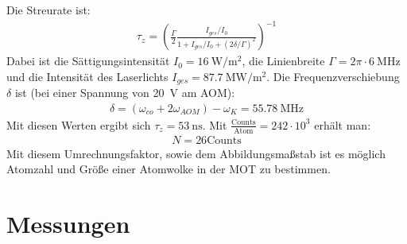 \documentclass[12pt, a4paper]{article}
\begin{document}
    Die Streurate ist:
    \begin{align*}
      \tau_z = \left(
        \frac{\Gamma}{2}
        \frac{I_{ges} / I_0}{1 + I_{ges} / I_0 + (2 \delta / \Gamma)^2}
      \right)^{-1}
    \end{align*}
    Dabei ist die Sättigungsintensität $I_0 = \SI{16}{\W\per\square\m}$, die
    Linienbreite $\Gamma = 2 \pi \cdot \SI{6}{\MHz}$ und die Intensität des Laserlichts
    $I_{ges} = \SI{87.7}{\mega\W\per\square\m}$. Die Frequenzverschiebung $\delta$ ist
    (bei einer Spannung von \SI{20}{\V} am AOM):
    \begin{align*}
      \delta = (\omega_{co} + 2 \omega_{AOM}) - \omega_K = \SI{55.78}{\MHz}
    \end{align*}
    Mit diesen Werten ergibt sich $\tau_z = \SI{53}{\nano\s}$. Mit
    $\frac{\text{Counts}}{\text{Atom}} = 242 \cdot 10^3$ erhält man:
    \begin{align*}
      N = 26 \text{Counts}
    \end{align*}
    Mit diesem Umrechnungsfaktor, sowie dem Abbildungsmaßstab ist es möglich Atomzahl
    und Größe einer Atomwolke in der MOT zu bestimmen.
\newpage
\section{Messungen}
\end{document}
